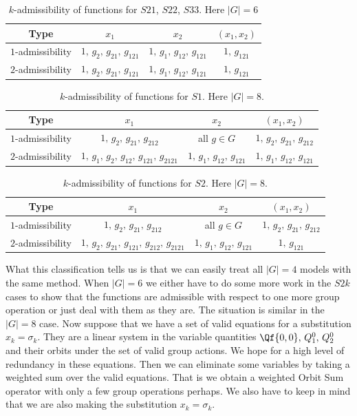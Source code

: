 \begin{table}[H]
\caption{$k$-admissibility of functions for $S21$, $S22$, $S33$. Here $|G| = 6$}
\label{tbl:Admissibility62}
\centering
\begin{tabular}{cccc}
\toprule
	Type & $x_1$  & $x_2$ & $(x_1,x_2)$ \\
\midrule
	$1$-admissibility & $1,\, g_{2} ,\, g_{21} ,\, g_{121}$ & $1,\, g_{1} ,\, g_{12} ,\, g_{121}$ & $1,\, g_{121}$ \\
	$2$-admissibility & $1,\, g_{2} ,\, g_{21} ,\, g_{121}$ & $1,\, g_{1} ,\, g_{12} ,\, g_{121}$ & $1,\, g_{121}$ \\
\bottomrule
\end{tabular}
\end{table}

\begin{table}[H]
\caption{$k$-admissibility of functions for $S1$. Here $|G| = 8$.}
\label{tbl:Admissibility81}
\centering
\begin{tabular}{cccc}
\toprule
	Type & $x_1$  & $x_2$ & $(x_1,x_2)$ \\
\midrule
	$1$-admissibility & $1,\, g_{2} ,\, g_{21} ,\, g_{212}$ & all $g\in G$ & $1,\, g_{2} ,\, g_{21} ,\, g_{212}$ \\
	$2$-admissibility & $1,\, g_{1} ,\, g_{2} ,\, g_{12},\, g_{121},\, g_{2121}$ & $1,\, g_{1} ,\, g_{12} ,\, g_{121}$ & $1,\, g_{1} ,\, g_{12} ,\, g_{121}$ \\
\bottomrule
\end{tabular}
\end{table}

\begin{table}[H]
\caption{$k$-admissibility of functions for $S2$. Here $|G| = 8$.}
\label{tbl:Admissibility82}
\centering
\begin{tabular}{cccc}
\toprule
	Type & $x_1$  & $x_2$ & $(x_1,x_2)$ \\
\midrule
	$1$-admissibility & $1,\, g_{2} ,\, g_{21} ,\, g_{212}$ & all $g\in G$ & $1,\, g_{2} ,\, g_{21} ,\, g_{212}$ \\
	$2$-admissibility & $1,\, g_{2} ,\, g_{21} ,\, g_{121},\, g_{212},\, g_{2121}$ & $1,\, g_{1} ,\, g_{12} ,\, g_{121}$ & $1,\, g_{121}$ \\
\bottomrule
\end{tabular}
\end{table}

What this classification tells us is that we can easily treat all $|G| = 4$ models with the same method. When $|G| = 6$ we either have to do some more work in the $S2k$ cases to show that the functions are admissible with respect to one more group operation or just deal with them as they are. The situation is similar in the $|G| = 8$ case. Now suppose that we have a set of valid equations for a substitution $x_k = \sigma_k$. They are a linear system in the variable quantities $\Qf{0,0},\, Q_1^0,\, Q_2^0$ and their orbits under the set of valid group actions. We hope for a high level of redundancy in these equations. Then we can eliminate some variables by taking a weighted sum over the valid equations. That is we obtain a weighted Orbit Sum operator with only a few group operations perhaps. We also have to keep in mind that we are also making the substitution $x_k = \sigma_k$.

